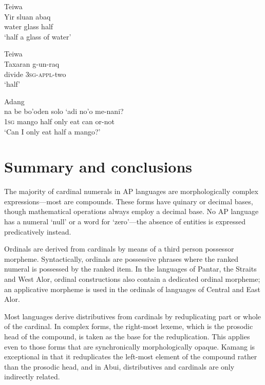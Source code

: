 \ea%
\label{bkm:Ref342746926}
{\upshape Teiwa}\\
\gll   Yir  sluan  abaq   \\  
    water  glass  half      \\
\glt  `half a glass of water'
\z

               

              




\ea%
\label{bkm:Ref342746963}
{\upshape Teiwa}\\
\gll   Taxaran  g-un-raq   \\  
   divide  \textsc{3sg}-\textsc{appl}-two      \\
\glt `half' 
\z

               

               
\ea
\label{ex:8:1250}
{\upshape Adang}\\
\gll na  be  bo'oden  solo  `adi  no'o  me-nani? \\
  1\textsc{sg } mango  half  only  eat  can  or-not\\
\glt `Can I only eat half a mango?'
\z
 
 

 

\section{Summary and conclusions}
\label{sec:8:Summary}
The majority of cardinal numerals in AP languages are morphologically complex expressions---most are compounds. These forms have quinary or decimal bases, though mathematical operations always employ a decimal base. No AP language has a numeral `null' or a word for `zero'---the absence of entities is expressed predicatively instead.

Ordinals are derived from cardinals by means of a third person possessor morpheme. Syntactically, ordinals are possessive phrases where the ranked numeral is possessed by the ranked item. In the languages of Pantar, the Straits and West Alor, ordinal constructions also contain a dedicated ordinal morpheme; an applicative morpheme is used in the ordinals of languages of Central and East Alor. 

Most languages derive distributives from cardinals by reduplicating part or whole of the cardinal. In complex forms, the right-most lexeme, which is the prosodic head of the compound, is taken as the base for the reduplication. This applies even to those forms that are synchronically morphologically opaque. Kamang is exceptional in that it reduplicates the left-most element of the compound rather than the prosodic head, and in Abui, distributives and cardinals are only indirectly related. 

